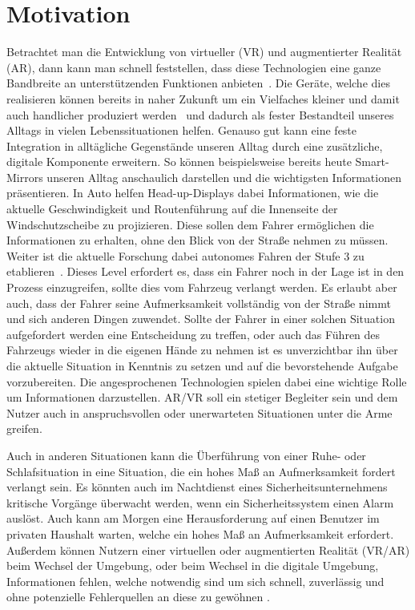 \section{Motivation}\label{sec:motivation}

Betrachtet man die Entwicklung von virtueller (VR) und augmentierter Realität (AR), dann kann man schnell feststellen, dass diese Technologien eine ganze Bandbreite an unterstützenden Funktionen anbieten~\cite{hughes2005mixed,medenica2011augmented,hayhurst2018augmented}. Die Geräte, welche dies realisieren können bereits in naher Zukunft um ein Vielfaches kleiner und damit auch handlicher produziert werden~\cite{shibata2002head} und dadurch als fester Bestandteil unseres Alltags in vielen Lebenssituationen helfen.
Genauso gut kann eine feste Integration in alltägliche Gegenstände unseren Alltag durch eine zusätzliche, digitale Komponente erweitern. So können beispielsweise bereits heute Smart-Mirrors unseren Alltag anschaulich darstellen und die wichtigsten Informationen präsentieren. 
In Auto helfen Head-up-Displays dabei Informationen, wie die aktuelle Geschwindigkeit und Routenführung auf die Innenseite der Windschutzscheibe zu projizieren. Diese sollen dem Fahrer ermöglichen die Informationen zu erhalten, ohne den Blick von der Straße nehmen zu müssen.
Weiter ist die aktuelle Forschung dabei autonomes Fahren der Stufe 3 zu etablieren~\cite{rodel2014towards}. Dieses Level erfordert es, dass ein Fahrer noch in der Lage ist in den Prozess einzugreifen, sollte dies vom Fahrzeug verlangt werden. Es erlaubt aber auch, dass der Fahrer seine Aufmerksamkeit vollständig von der Straße nimmt und sich anderen Dingen zuwendet.
Sollte der Fahrer in einer solchen Situation aufgefordert werden eine Entscheidung zu treffen, oder auch das Führen des Fahrzeugs wieder in die eigenen Hände zu nehmen ist es unverzichtbar ihn über die aktuelle Situation in Kenntnis zu setzen und auf die bevorstehende Aufgabe vorzubereiten. 
Die angesprochenen Technologien spielen dabei eine wichtige Rolle um Informationen darzustellen. AR/VR soll ein stetiger Begleiter sein und dem Nutzer auch in anspruchsvollen oder unerwarteten Situationen unter die Arme greifen.

Auch in anderen Situationen kann die Überführung von einer Ruhe- oder Schlafsituation in eine Situation, die ein hohes Maß an Aufmerksamkeit fordert verlangt sein. Es könnten auch im Nachtdienst eines Sicherheitsunternehmens kritische Vorgänge überwacht werden, wenn ein Sicherheitssystem einen Alarm auslöst. Auch kann am Morgen eine Herausforderung auf einen Benutzer im privaten Haushalt warten, welche ein hohes Maß an Aufmerksamkeit erfordert. 
Außerdem können Nutzern einer virtuellen oder augmentierten Realität (VR/AR) beim Wechsel der Umgebung, oder beim Wechsel in die digitale Umgebung, Informationen fehlen, welche notwendig sind um sich schnell, zuverlässig und ohne potenzielle Fehlerquellen an diese zu gewöhnen \cite{knibbe2018dream}.

